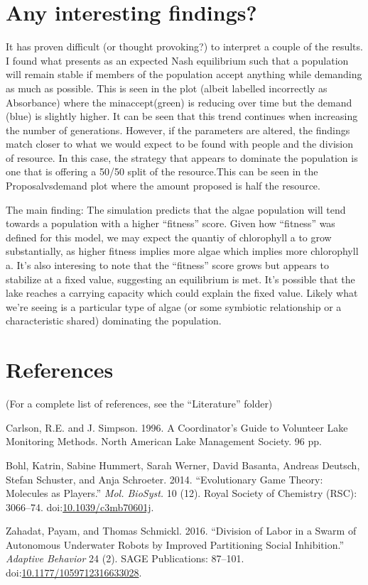 \documentclass[]{article}
\begin{document}
\section{Any interesting findings?}\label{any-interesting-findings}

It has proven difficult (or thought provoking?) to interpret a couple of
the results. I found what presents as an expected Nash equilibrium such
that a population will remain stable if members of the population accept
anything while demanding as much as possible. This is seen in the plot
(albeit labelled incorrectly as Absorbance) where the minaccept(green)
is reducing over time but the demand (blue) is slightly higher. It can
be seen that this trend continues when increasing the number of
generations. However, if the parameters are altered, the findings match
closer to what we would expect to be found with people and the division
of resource. In this case, the strategy that appears to dominate the
population is one that is offering a 50/50 split of the resource.This
can be seen in the Proposalvsdemand plot where the amount proposed is
half the resource.

The main finding: The simulation predicts that the algae population will
tend towards a population with a higher ``fitness'' score. Given how
``fitness'' was defined for this model, we may expect the quantiy of
chlorophyll a to grow substantially, as higher fitness implies more
algae which implies more chlorophyll a. It's also interesing to note
that the ``fitness'' score grows but appears to stabilize at a fixed
value, suggesting an equilibrium is met. It's possible that the lake
reaches a carrying capacity which could explain the fixed value. Likely
what we're seeing is a particular type of algae (or some symbiotic
relationship or a characteristic shared) dominating the population.

\section{References}\label{references}

(For a complete list of references, see the ``Literature'' folder)

Carlson, R.E. and J. Simpson. 1996. A Coordinator's Guide to Volunteer
Lake Monitoring Methods. North American Lake Management Society. 96 pp.

\hypertarget{refs}{}
\hypertarget{ref-Bohl_2014}{}
Bohl, Katrin, Sabine Hummert, Sarah Werner, David Basanta, Andreas
Deutsch, Stefan Schuster, and Anja Schroeter. 2014. ``Evolutionary Game
Theory: Molecules as Players.'' \emph{Mol. BioSyst.} 10 (12). Royal
Society of Chemistry (RSC): 3066--74.
doi:\href{https://doi.org/10.1039/c3mb70601j}{10.1039/c3mb70601j}.

\hypertarget{ref-Zahadat_2016}{}
Zahadat, Payam, and Thomas Schmickl. 2016. ``Division of Labor in a
Swarm of Autonomous Underwater Robots by Improved Partitioning Social
Inhibition.'' \emph{Adaptive Behavior} 24 (2). SAGE Publications:
87--101.
doi:\href{https://doi.org/10.1177/1059712316633028}{10.1177/1059712316633028}.
\end{document}
